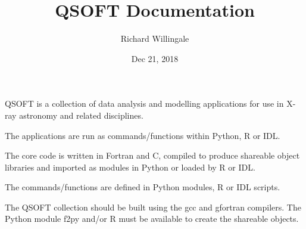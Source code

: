 \documentclass[letterpaper,10pt,english]{sphinxmanual}
\title{QSOFT Documentation}
\date{Dec 21, 2018}
\author{Richard Willingale}
\begin{document}
\pagestyle{empty}
\maketitle
\pagestyle{plain}
\sphinxtableofcontents
\pagestyle{normal}
\label{\detokenize{index::doc}}


QSOFT is a collection of data analysis and modelling applications for use in X-ray astronomy and related disciplines.

The applications are run as commands/functions within Python, R or IDL.

The core code is written in Fortran and C, compiled to produce shareable object libraries and imported as modules in Python or loaded by R or IDL.

The commands/functions are defined in Python modules, R or IDL scripts.

The QSOFT collection should be built using the gcc and gfortran compilers. The Python module f2py and/or R must be available to create the shareable objects.
\end{document}
